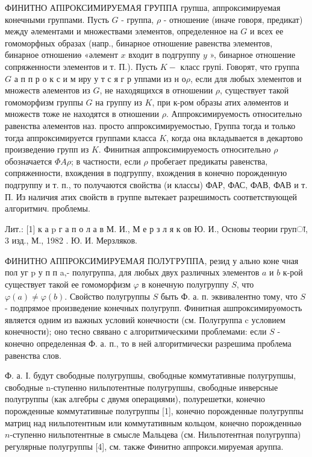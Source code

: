 \documentclass[10pt]{article}
\begin{document}
ФИНИТНО АПIРОКСИМИРУЕМАЯ ГРУППА групша, аппроксимируемая конечными группами. Пусть $G$ - группа, $\rho$ - отношение (иначе говоря, предикат) между әлементами и множествами элементов, определенное на $G$ и всех ее гомоморфных образах (напр., бинарное отношение равенства элементов, бинарное отношениө «әлемент $x$ входит в подгруппу $y$ », бинарное отношение сопряженности элементов и т. П.). Пусть $K-$ класс групі. Говорят, что группа $G$ а п п р о к с и м иру у т с я г р уппами из н $о \rho$, если для любых элементов и множеств әлементов из $G$, не находящихся в отношении $\rho$, существует такой гомоморфизм группы $G$ на группу из $K$, при к-ром образы атих әлөментов и множеств тоже не находятся в отношении $\rho$. Аппроксимируемость относительно равенства әлементов наз. просто аппроксимируемостью, Группа тогда и только тогда аппроксимируется группами класса $K$, когда она вкладывается в декартово произведениө групп из $K$. Финитная аппроксимируемость относительно $\rho$ обозначается $\Phi A \rho$; в частности, если $\rho$ пробегает предикаты равенства, сопряженности, вхождения в подгруппу, вхождения в конечно порожденную подгруппу и т. п., то получаются свойства (и классы) ФАР, ФАС, ФАВ, ФАВ и т. П. Из наличия атих свойств в группе вытекает разрешимость соответствующей алгоритмич. проблемы.



Лит.: [1] к а $\mathrm{p}$ г а п о л а в М. И., М е р з л я к ов Ю. И., Основы теории групा, 3 изд., М., 1982 . Ю. И. Мерзляков.



ФИНИТНО АППРОКСИМИРУЕМАЯ ПОЛУГРУППА, резид у ально коне чная пол уг p у п п a,- полугруппа, для любых двух различных элементов $a$ и $b$ к-рой существует такой ее гомоморфизм $\varphi$ в конечную полугруппу $S$, что $\varphi(a) \neq \varphi(b)$. Свойство полугруппы $S$ быть Ф. а. п. эквивалентно тому, что $S$ - подпрямое произведение конечных полугрупп. Финитная ашпроксимируөмость является одним из важных условий конечности (см. Полугруппа c условием конечности); оно тесно свявано с алгоритмическими проблемами: если $S$ - конечно определенная Ф. а. п., то в ней алгоритмически разрешима проблема равенства слов.



Ф. а. І. будут свободные полугрупшы, свободные коммутативные полугрупшы, свободные n-ступенно нильпотентные полугрупшы, свободные инверсные полугруппы (как алгебры с двумя операциями), полурешетки, конечно порожденные коммутативные полугруппы [1], конечно порожденные полугруппы матриц над нильпотентным или коммутативным кольцом, конечно порожденныө $n$-ступенно нильпотентные в смысле Мальцева (см. Нильпотентная полугруппа) регулярные полугруппы [4], см. также Финитно аппрокси.мируемая аруппа.
\end{document}

